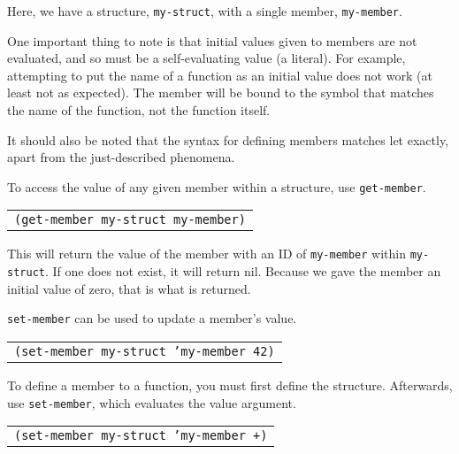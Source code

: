 \documentclass[
letterpaper,
oneside,
]{memoir}
\begin{document}
\noindent
Here, we have a structure, \texttt{my-struct}, with a single member, \texttt{my-member}.

\vspace{1em}
\noindent
One important thing to note is that initial values given to members are not evaluated, and so must be a self-evaluating value (a literal). For example, attempting to put the name of a function as an initial value does not work (at least not as expected). The member will be bound to the symbol that matches the name of the function, not the function itself.

\vspace{1em}
\noindent
It should also be noted that the syntax for defining members matches let exactly, apart from the just-described phenomena.

\filbreak

\vspace{1em}
\noindent
To access the value of any given member within a structure, use \texttt{get-member}.

\vspace{1em}
\begin{tabular}{l}
  \texttt{(get-member my-struct my-member)} \\
\end{tabular}
\vspace{1em}

\noindent
This will return the value of the member with an ID of \texttt{my-member} within \texttt{my-struct}. If one does not exist, it will return nil. Because we gave the member an initial value of zero, that is what is returned.

\filbreak

\vspace{1em}
\noindent
\texttt{set-member} can be used to update a member’s value.

\vspace{1em}
\begin{tabular}{l}
  \texttt{(set-member my-struct 'my-member 42)} \\
\end{tabular}
\vspace{1em}

\filbreak

\noindent
To define a member to a function, you must first define the structure. Afterwards, use \texttt{set-member}, which evaluates the value argument.

\vspace{1em}
\begin{tabular}{l}
  \texttt{(set-member my-struct 'my-member +)} \\
\end{tabular}
\vspace{1em}
\end{document}
